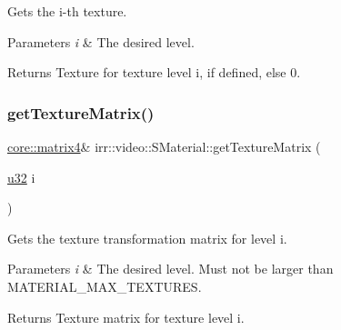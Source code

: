 Gets the i-\/th texture. 


\begin{DoxyParams}{Parameters}
{\em i} & The desired level. \\
\hline
\end{DoxyParams}
\begin{DoxyReturn}{Returns}
Texture for texture level i, if defined, else 0. 
\end{DoxyReturn}
\mbox{\label{classirr_1_1video_1_1SMaterial_a102aec38ea69a7c609edfad74b40463c}} 
\subsubsection{\texorpdfstring{get\+Texture\+Matrix()}{getTextureMatrix()}\hspace{0.1cm}{\footnotesize\ttfamily [1/4]}}
{\footnotesize\ttfamily \hyperlink{namespaceirr_1_1core_a4c9d4e29899535971052810954a14431}{core\+::matrix4}\& irr\+::video\+::\+S\+Material\+::get\+Texture\+Matrix (\begin{DoxyParamCaption}\item[{\hyperlink{namespaceirr_a0416a53257075833e7002efd0a18e804}{u32}}]{i }\end{DoxyParamCaption})\hspace{0.3cm}{\ttfamily [inline]}}



Gets the texture transformation matrix for level i. 


\begin{DoxyParams}{Parameters}
{\em i} & The desired level. Must not be larger than M\+A\+T\+E\+R\+I\+A\+L\+\_\+\+M\+A\+X\+\_\+\+T\+E\+X\+T\+U\+R\+ES. \\
\hline
\end{DoxyParams}
\begin{DoxyReturn}{Returns}
Texture matrix for texture level i. 
\end{DoxyReturn}
\mbox{\label{classirr_1_1video_1_1SMaterial_a102aec38ea69a7c609edfad74b40463c}} 
